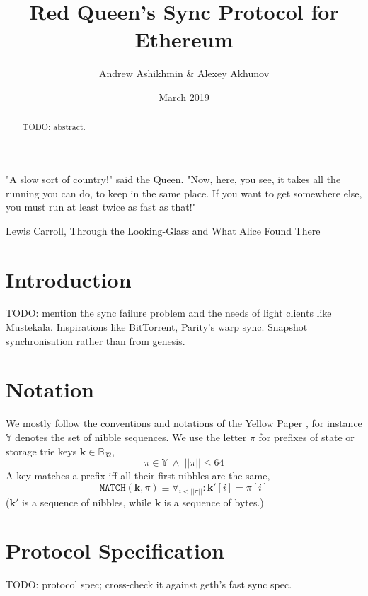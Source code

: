 \documentclass{amsart}
\begin{document}
\title{Red Queen's Sync Protocol for Ethereum}
\author{Andrew Ashikhmin \& Alexey Akhunov}
\date{March 2019}

\begin{abstract}
TODO: abstract.
\end{abstract}

\maketitle

\epigraph{
    "A slow sort of country!" said the Queen.
    "Now, here, you see, it takes all the running you can do, to keep in the same place.
    If you want to get somewhere else, you must run at least twice as fast as that!"
    }{Lewis Carroll, Through the Looking-Glass and What Alice Found There}

\section{Introduction}
TODO: mention the sync failure problem \cite{akhunov_1x_workshop_part1} and the needs of light clients like Mustekala.
Inspirations like BitTorrent, Parity's warp sync.
Snapshot synchronisation rather than from genesis.

\section{Notation}
We mostly follow the conventions and notations of the Yellow Paper \cite{yellow_paper},
for instance $\mathbb{Y}$ denotes the set of nibble sequences.
We use the letter $\pi$ for prefixes of state or storage trie keys $\mathbf{k} \in \mathbb{B}_{32}$,
\begin{equation}
    \pi \in \mathbb{Y} \; \land \; ||\pi|| \leq 64
\end{equation}
A key matches a prefix iff all their first nibbles are the same,
\begin{equation}
    \texttt{MATCH}(\mathbf{k}, \pi) \equiv \forall_{i < ||\pi||}: \mathbf{k}'[i] = \pi[i]
\end{equation}
($\mathbf{k}'$ is a sequence of nibbles, while $\mathbf{k}$ is a sequence of bytes.)

\section{Protocol Specification}
TODO: protocol spec; cross-check it against geth's fast sync spec.
\end{document}
